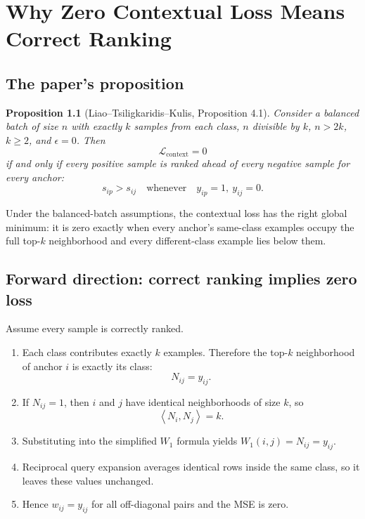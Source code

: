 \documentclass[11pt,oneside,openany]{book}
\theoremstyle{myplain}
\newtheorem{proposition}{Proposition}[chapter]
\theoremstyle{definition}
\newcommand{\inner}[2]{\left\langle #1,#2\right\rangle}
\begin{document}
\chapter{Why Zero Contextual Loss Means Correct Ranking}
\label{chap:proof}

\section{The paper's proposition}
\label{sec:proposition}

\begin{proposition}[Liao--Tsiligkaridis--Kulis, Proposition 4.1]
Consider a balanced batch of size $n$ with exactly $k$ samples from each class, $n$ divisible by $k$, $n>2k$, $k\ge2$, and $\epsilon=0$. Then
\[
\mathcal L_{\mathrm{context}}=0
\]
if and only if every positive sample is ranked ahead of every negative sample for every anchor:
\[
  s_{ip}>s_{ij}
  \quad\text{whenever}\quad y_{ip}=1,\ y_{ij}=0.
\]
\end{proposition}

\begin{conceptbox}[title=Plain-language translation]
Under the balanced-batch assumptions, the contextual loss has the right global minimum: it is zero exactly when every anchor's same-class examples occupy the full top-$k$ neighborhood and every different-class example lies below them.
\end{conceptbox}

\section{Forward direction: correct ranking implies zero loss}

Assume every sample is correctly ranked.

\begin{enumerate}[leftmargin=*,label=\textbf{Step \arabic*.},itemsep=5pt]
  \item Each class contributes exactly $k$ examples. Therefore the top-$k$ neighborhood of anchor $i$ is exactly its class:
  \[
    N_{ij}=y_{ij}.
  \]
  \item If $N_{ij}=1$, then $i$ and $j$ have identical neighborhoods of size $k$, so
  \[
    \inner{N_i}{N_j}=k.
  \]
  \item Substituting into the simplified $W_1$ formula yields $W_1(i,j)=N_{ij}=y_{ij}$.
  \item Reciprocal query expansion averages identical rows inside the same class, so it leaves these values unchanged.
  \item Hence $w_{ij}=y_{ij}$ for all off-diagonal pairs and the MSE is zero.
\end{enumerate}
\end{document}
